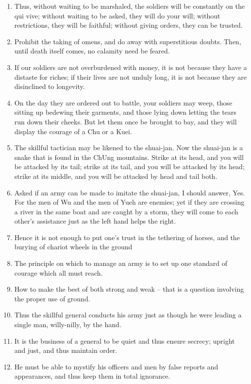 \documentclass[oneside]{book}
\begin{document}
\begin{enumerate}
	\item Thus, without waiting to be marshaled, the soldiers will be constantly on the qui vive; without waiting to be asked, they will do your will; without restrictions, they will be faithful; without giving orders, they can be trusted.
	\item Prohibit the taking of omens, and do away with superstitious doubts. Then, until death itself comes, no calamity need be feared.
	\item If our soldiers are not overburdened with money, it is not because they have a distaste for riches; if their lives are not unduly long, it is not because they are disinclined to longevity.
	\item On the day they are ordered out to battle, your soldiers may weep, those sitting up bedewing their garments, and those lying down letting the tears run down their cheeks. But let them once be brought to bay, and they will display the courage of a Chu or a Kuei.
	\item The skillful tactician may be likened to the shuai-jan. Now the shuai-jan is a snake that is found in the ChUng mountains. Strike at its head, and you will be attacked by its tail; strike at its tail, and you will be attacked by its head; strike at its middle, and you will be attacked by head and tail both.
	\item Asked if an army can be made to imitate the shuai-jan, I should answer, Yes. For the men of Wu and the men of Yueh are enemies; yet if they are crossing a river in the same boat and are caught by a storm, they will come to each other's assistance just as the left hand helps the right.
	\item Hence it is not enough to put one's trust in the tethering of horses, and the burying of chariot wheels in the ground
	\item The principle on which to manage an army is to set up one standard of courage which all must reach.
	\item How to make the best of both strong and weak – that is a question involving the proper use of ground.
	\item Thus the skillful general conducts his army just as though he were leading a single man, willy-nilly, by the hand.
	\item It is the business of a general to be quiet and thus ensure secrecy; upright and just, and thus maintain order.
	\item He must be able to mystify his officers and men by false reports and appearances, and thus keep them in total ignorance.

\end{enumerate}
\end{document}
